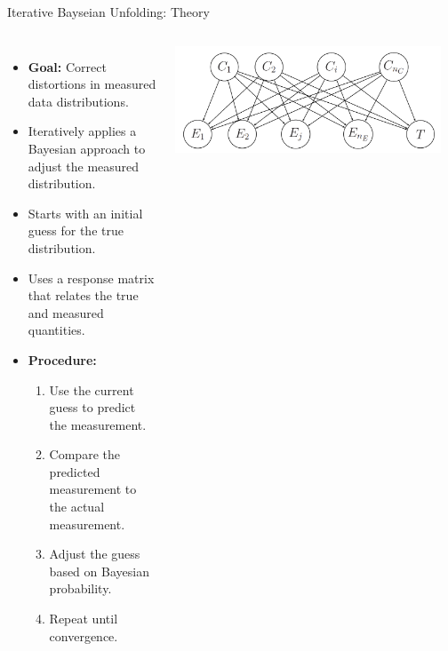 \documentclass[aspectratio=169]{beamer}
\begin{document}
\begin{frame}{Iterative Bayseian Unfolding: Theory}
\begin{columns}
    \begin{itemize}
            \item \textbf{Goal:} Correct distortions in measured data distributions.
            \item Iteratively applies a Bayesian approach to adjust the measured distribution.
            \item Starts with an initial guess for the true distribution.
            \item Uses a response matrix that relates the true and measured quantities.
            \item \textbf{Procedure:}
                \begin{enumerate}
                    \item Use the current guess to predict the measurement.
                    \item Compare the predicted measurement to the actual measurement.
                    \item Adjust the guess based on Bayesian probability.
                    \item Repeat until convergence.
                \end{enumerate}
        \end{itemize}
        
    \includegraphics[width=0.95\textwidth]{Main/ibu/theory.png} %
    
\end{columns}
 

\end{frame}

%


\end{document}

